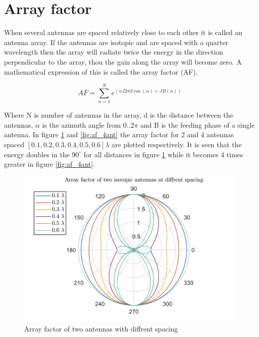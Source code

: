 
\section{Array factor}
When several antennas are spaced relatively close to each other it is called an antenna array. If the antennas are isotopic and are spaced with a quarter wavelength then the array will radiate twice the energy in the direction perpendicular to the array, thou the gain along the array will become zero. A mathematical expression of this is called the array factor (AF).

\begin{equation}
AF = \sum_{n=1}^{N} e^{(n J 2\pi d \cos(\alpha)+JB(n))}
\end{equation}

Where N is number of antennas in the array, d is the distance between the antennas, $\alpha$ is the azimuth angle from $0..2\pi$ and B is the feeding phase of a single antenna. In figure \ref{fig:af_2ant} and \ref{fig:af_4ant} the array factor for 2 and 4 antennas spaced $[0.1, 0.2, 0.3, 0.4, 0.5, 0.6]\lambda$ are plotted respectively. It is seen that the energy doubles in the $90^\circ$ for all distances in figure \ref{fig:af_2ant} while it becomes 4 times greater in figure \ref{fig:af_4ant}.   


\begin{figure}[H]
\centering 
\includegraphics[scale = 0.7]{figures/measurement/af_2ant.png}
\caption{Array factor of two antennas with diffrent spacing}
\label{fig:af_2ant}
\end{figure}


